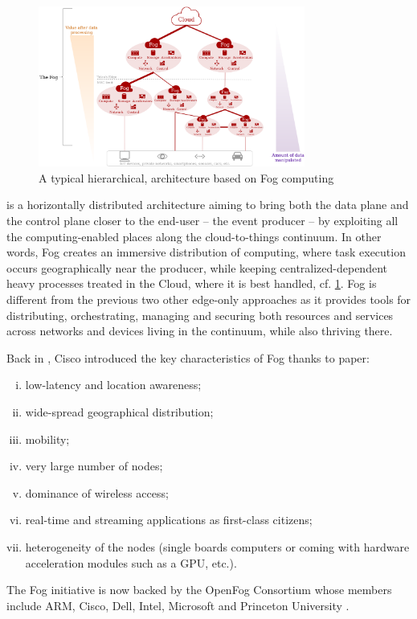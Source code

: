 \documentclass[11pt]{sdm}
\begin{document}
\begin{description}[leftmargin=10pt]
	\begin{figure}[t]
		\centering
		\includegraphics[width=0.78\textwidth]{./assets/FogArchitecture.drawio.png}
		\caption{A typical hierarchical, architecture based on Fog computing \cite{ieee_standards_association_ieee_2018}}
		\label{fig:fog_archi}
	\end{figure}

	\item[Fog computing] is a horizontally distributed architecture aiming to bring both the data plane and the control plane closer to the end-user -- the event producer -- by exploiting all the computing-enabled places along the cloud-to-things continuum. In other words, Fog creates an immersive distribution of computing, where task execution occurs geographically near the producer, while keeping centralized-dependent heavy processes treated in the Cloud, where it is best handled, cf. \cref{fig:fog_archi}. Fog is different from the previous two other edge-only approaches as it provides tools for distributing, orchestrating, managing and securing both resources and services across networks and devices living in the continuum, while also thriving there.

	Back in , Cisco introduced the key characteristics of Fog thanks to  paper:
	\begin{enumerate}[(i)]
		\item low-latency and location awareness;
		\item wide-spread geographical distribution;
		\item mobility;
		\item very large number of nodes;
		\item dominance of wireless access;
		\item real-time and streaming applications as first-class citizens;
		\item heterogeneity of the nodes (single boards computers or coming with hardware acceleration modules such as a \gls{GPU}, etc.).
	\end{enumerate}
	The Fog initiative is now backed by the OpenFog Consortium \cite{ieee_standards_association_ieee_2018} whose members include ARM, Cisco, Dell, Intel, Microsoft and Princeton University \cite{chiang_fog_2016}.
\end{description}
\end{document}
